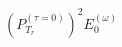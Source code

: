 \documentclass[preview]{standalone}
\begin{document}
\begin{align*}
(P_{T_r}^{(\tau=0)})^2E_0^{(\omega)}
\end{align*}
\end{document}
